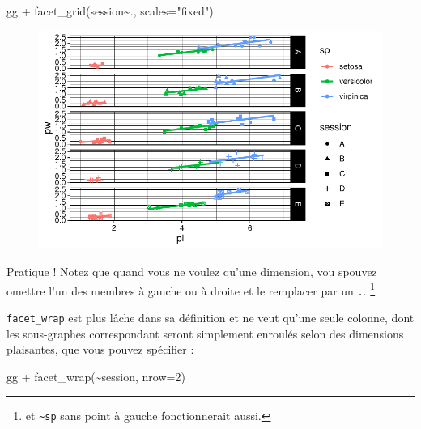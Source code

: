 \documentclass[
  letterpaper,
  DIV=11,
  numbers=noendperiod]{scrreprt}
\newenvironment{Shaded}{\begin{snugshade}}{\end{snugshade}}
\newcommand{\AttributeTok}[1]{\textcolor[rgb]{0.40,0.45,0.13}{#1}}
\newcommand{\DecValTok}[1]{\textcolor[rgb]{0.68,0.00,0.00}{#1}}
\newcommand{\FunctionTok}[1]{\textcolor[rgb]{0.28,0.35,0.67}{#1}}
\newcommand{\NormalTok}[1]{\textcolor[rgb]{0.00,0.23,0.31}{#1}}
\newcommand{\SpecialCharTok}[1]{\textcolor[rgb]{0.37,0.37,0.37}{#1}}
\newcommand{\StringTok}[1]{\textcolor[rgb]{0.13,0.47,0.30}{#1}}
\begin{document}
\begin{Shaded}
\begin{Highlighting}[]
\NormalTok{gg }\SpecialCharTok{+} \FunctionTok{facet\_grid}\NormalTok{(session}\SpecialCharTok{\textasciitilde{}}\NormalTok{., }\AttributeTok{scales=}\StringTok{"fixed"}\NormalTok{)}
\end{Highlighting}
\end{Shaded}

\begin{figure}[H]

{\centering \includegraphics{ggplot2_files/figure-pdf/unnamed-chunk-27-3.pdf}

}

\end{figure}

Pratique ! Notez que quand vous ne voulez qu'une dimension, vou spouvez
omettre l'un des membres à gauche ou à droite et le remplacer par un
\texttt{.}. \footnote{et \texttt{\textasciitilde{}sp} sans point à
  gauche fonctionnerait aussi.}

\texttt{facet\_wrap} est plus lâche dans sa définition et ne veut qu'une
seule colonne, dont les sous-graphes correspondant seront simplement
enroulés selon des dimensions plaisantes, que vous pouvez spécifier :

\begin{Shaded}
\begin{Highlighting}[]
\NormalTok{gg }\SpecialCharTok{+} \FunctionTok{facet\_wrap}\NormalTok{(}\SpecialCharTok{\textasciitilde{}}\NormalTok{session, }\AttributeTok{nrow=}\DecValTok{2}\NormalTok{)}
\end{Highlighting}
\end{Shaded}
\end{document}
